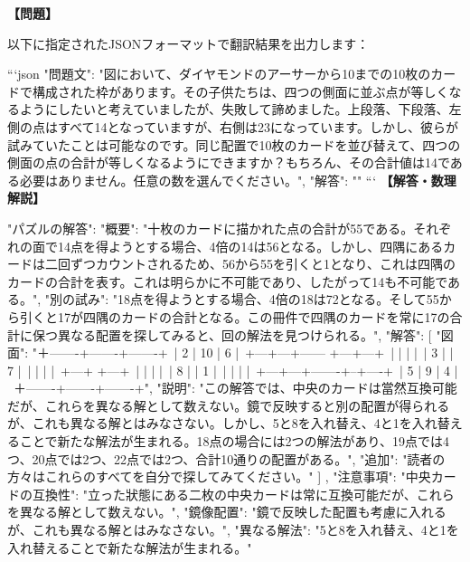 \documentclass[10pt,a4paper,oneside,openany]{ltjsbook}
\begin{document}
\begin{tcolorbox}[colback=softblue,colframe=primaryblue,title=\textbf{第 381 問：THE CARD FRAME PUZZLE.},arc=2mm,boxrule=1pt,breakable]
\textbf{【問題】}\par\vspace{0.3em}
以下に指定されたJSONフォーマットで翻訳結果を出力します：

```json
{
  "問題文": "図において、ダイヤモンドのアーサーから10までの10枚のカードで構成された枠があります。その子供たちは、四つの側面に並ぶ点が等しくなるようにしたいと考えていましたが、失敗して諦めました。上段落、下段落、左側の点はすべて14となっていますが、右側は23になっています。しかし、彼らが試みていたことは可能なのです。同じ配置で10枚のカードを並び替えて、四つの側面の点の合計が等しくなるようにできますか？もちろん、その合計値は14である必要はありません。任意の数を選んでください。",
  "解答": ""
}
```
\tcblower
\textbf{【解答・数理解説】}\par\vspace{0.3em}
{
    "パズルの解答": {
        "概要": "十枚のカードに描かれた点の合計が55である。それぞれの面で14点を得ようとする場合、4倍の14は56となる。しかし、四隅にあるカードは二回ずつカウントされるため、56から55を引くと1となり、これは四隅のカードの合計を表す。これは明らかに不可能であり、したがって14も不可能である。",
        "別の試み": "18点を得ようとする場合、4倍の18は72となる。そして55から引くと17が四隅のカードの合計となる。この冊件で四隅のカードを常に17の合計に保つ異なる配置を探してみると、回の解法を見つけられる。",
        "解答": [
            {
                "図面": "＋-------+-------+-------+\
|   2   |  10   |   6   |\
+---+---+------ +---+---+\
|   |               |   |\
| 3 |               | 7 |\
|   |               |   |\
+---+               +---+\
|   |               |   |\
| 8 |               | 1 |\
|   |               |   |\
+---+---+-------+--+----+\
|   5   |   9   |   4   |\
＋-------+-------+-------+",
                "説明": "この解答では、中央のカードは當然互換可能だが、これらを異なる解として数えない。鏡で反映すると別の配置が得られるが、これも異なる解とはみなさない。しかし、5と8を入れ替え、4と1を入れ替えることで新たな解法が生まれる。18点の場合には2つの解法があり、19点では4つ、20点では2つ、22点では2つ、合計10通りの配置がある。",
                "追加": "読者の方々はこれらのすべてを自分で探してみてください。"
            }
        ]
    },
    "注意事項": {
        "中央カードの互換性": "立った狀態にある二枚の中央カードは常に互換可能だが、これらを異なる解として数えない。",
        "鏡像配置": "鏡で反映した配置も考慮に入れるが、これも異なる解とはみなさない。",
        "異なる解法": "5と8を入れ替え、4と1を入れ替えることで新たな解法が生まれる。"
    }
}
\end{tcolorbox}
\end{document}
